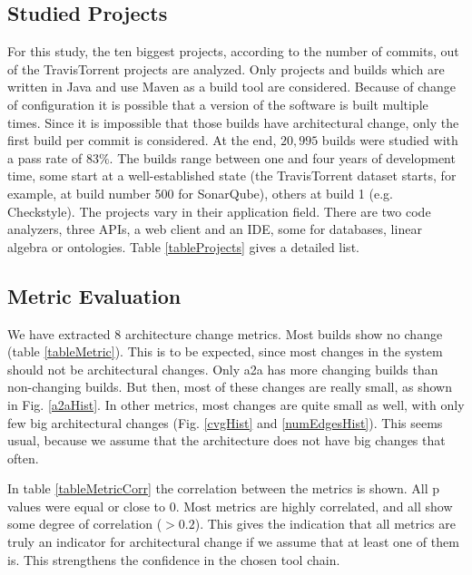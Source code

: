 \documentclass[conference]{IEEEtran}
\begin{document}
\subsection{Studied Projects}

For this study, the ten biggest projects, according to the number of commits, out of the TravisTorrent projects are analyzed. Only projects and builds which are written in Java and use Maven as a build tool are considered. Because of change of configuration it is possible that a version of the software is built multiple times. Since it is impossible that those builds have architectural change, only the first build per commit is considered. 
At the end, $20,995$ builds were studied with a pass rate of $83\%$. The builds range between one and four years of development time, some start at a well-established state (the TravisTorrent dataset starts, for example, at build number 500 for SonarQube), others at build 1 (e.g. Checkstyle). The projects vary in their application field. There are two code analyzers, three APIs, a web client and an IDE, some for databases, linear algebra or ontologies. Table \ref{tableProjects} gives a detailed list.

\subsection{Metric Evaluation}



We have extracted 8 architecture change metrics. Most builds show no change (table \ref{tableMetric}). This is to be expected, since most changes in the system should not be architectural changes. 
Only a2a has more changing builds than non-changing builds. But then, most of these changes are really small, as shown in Fig. \ref{a2aHist}. In other metrics, most changes are quite small as well, with only few big architectural changes (Fig. \ref{cvgHist} and \ref{numEdgesHist}). This seems usual, because we assume that the architecture does not have big changes that often.

In table \ref{tableMetricCorr} the correlation between the metrics is shown. All p values were equal or close to 0. Most metrics are highly correlated, and all show some degree of correlation ($>0.2$). This gives the indication that all metrics are truly an indicator for architectural change if we assume that at least one of them is. This strengthens the confidence in the chosen tool chain. 
\end{document}
